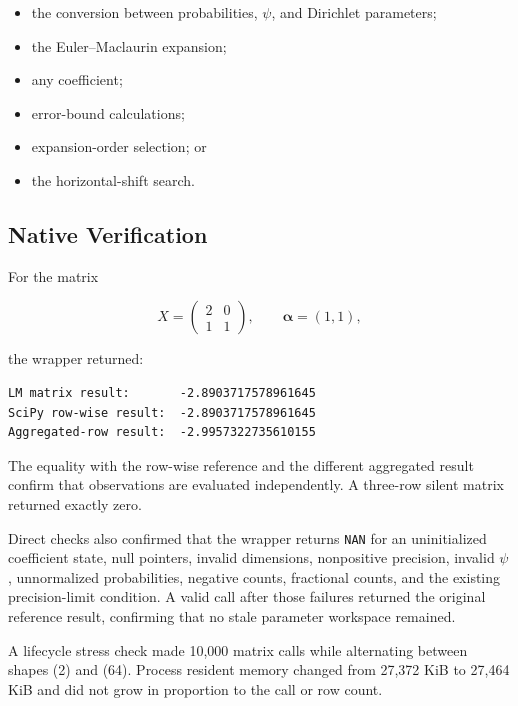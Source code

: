 \documentclass[11pt,a4paper]{article}
\begin{document}
\begin{itemize}

\item the conversion between probabilities, \(\psi\), and Dirichlet
parameters;

\item the Euler--Maclaurin expansion;

\item any coefficient;

\item error-bound calculations;

\item expansion-order selection; or

\item the horizontal-shift search.

\end{itemize}

\subsection{Native Verification}

For the matrix

\[
X=
\begin{pmatrix}
2 & 0\\
1 & 1
\end{pmatrix},
\qquad
\boldsymbol{\alpha}=(1,1),
\]

the wrapper returned:

\begin{verbatim}
LM matrix result:       -2.8903717578961645
SciPy row-wise result:  -2.8903717578961645
Aggregated-row result:  -2.9957322735610155
\end{verbatim}

The equality with the row-wise reference and the different aggregated result
confirm that observations are evaluated independently. A three-row silent
matrix returned exactly zero.

Direct checks also confirmed that the wrapper returns \texttt{NAN} for an
uninitialized coefficient state, null pointers, invalid dimensions,
nonpositive precision, invalid \(\psi\), unnormalized probabilities, negative
counts, fractional counts, and the existing precision-limit condition. A valid
call after those failures returned the original reference result, confirming
that no stale parameter workspace remained.

A lifecycle stress check made 10,000 matrix calls while alternating between
shapes (2) and (64). Process resident memory changed from
27,372 KiB to 27,464 KiB and did not grow in proportion to the call or row
count.
\end{document}
